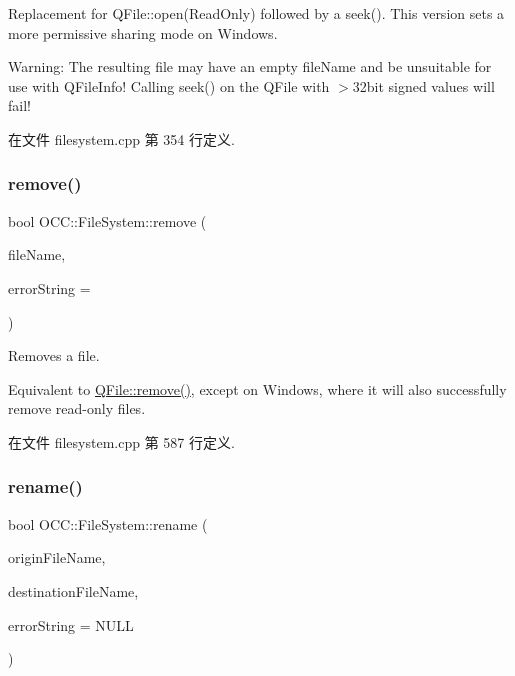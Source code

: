 Replacement for Q\+File\+::open(\+Read\+Only) followed by a seek(). This version sets a more permissive sharing mode on Windows.

Warning\+: The resulting file may have an empty file\+Name and be unsuitable for use with Q\+File\+Info! Calling seek() on the Q\+File with $>$32bit signed values will fail! 

在文件 filesystem.\+cpp 第 354 行定义.

\mbox{\label{namespace_o_c_c_1_1_file_system_a9b2aefeca6606b462584cab952edcbc1}} 
\subsubsection{\texorpdfstring{remove()}{remove()}}
{\footnotesize\ttfamily bool O\+C\+C\+::\+File\+System\+::remove (\begin{DoxyParamCaption}\item[{const Q\+String \&}]{file\+Name,  }\item[{Q\+String $\ast$}]{error\+String = {} }\end{DoxyParamCaption})}

Removes a file.

Equivalent to \hyperlink{namespace_o_c_c_1_1_file_system_a9b2aefeca6606b462584cab952edcbc1}{Q\+File\+::remove()}, except on Windows, where it will also successfully remove read-\/only files. 

在文件 filesystem.\+cpp 第 587 行定义.

\mbox{\label{namespace_o_c_c_1_1_file_system_a8aecdf1d35430c2d0e9b8c6d274c71dc}} 
\subsubsection{\texorpdfstring{rename()}{rename()}}
{\footnotesize\ttfamily bool O\+C\+C\+::\+File\+System\+::rename (\begin{DoxyParamCaption}\item[{const Q\+String \&}]{origin\+File\+Name,  }\item[{const Q\+String \&}]{destination\+File\+Name,  }\item[{Q\+String $\ast$}]{error\+String = {\ttfamily NULL} }\end{DoxyParamCaption})}



